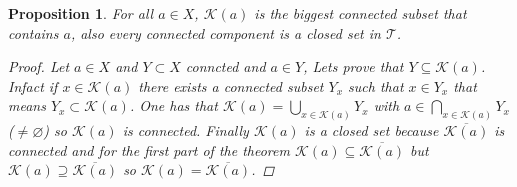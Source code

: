 \documentclass{article}
\newtheorem{proposition}{Proposition}
\begin{document}
            \begin{proposition}
                For all $a \in X$, $\mathcal{K}(a)$ is the biggest connected subset that contains $a$, also every connected component is a closed set in $\mathcal{T}$.
                \begin{proof}
                    Let $a \in X$ and $Y \subset X$ conncted and $a \in Y$, Lets prove that $Y \subseteq \mathcal{K}(a)$. Infact if $x \in \mathcal{K}(a) $ there exists a connected subset $Y_x$ such that $x \in Y_x$ that means $Y_x \subset \mathcal{K}(a)$. One has that $\mathcal{K}(a) = \bigcup_{x \in \mathcal{K}(a)}Y_x $ with $a \in \bigcap_{x\in \mathcal{K}(a)}Y_x$ ($\neq \varnothing$) so $\mathcal{K}(a)$ is connected. Finally $\mathcal{K}(a)$ is a closed set because $\overline{\mathcal{K}(a)}$ is connected and for the first part of the theorem $\mathcal{K}(a)\subseteq\overline{\mathcal{K}(a)}$ but $\mathcal{K}(a) \supseteq \overline{\mathcal{K}(a)}$ so $\mathcal{K}(a) = \overline{\mathcal{K}(a)}$.  
                \end{proof}
            \end{proposition}
        \newpage
\end{document}
